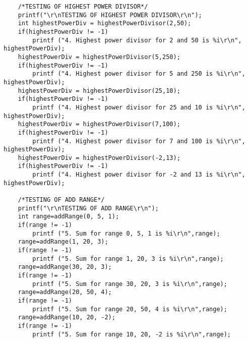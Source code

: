 \documentclass[4pt]{article}
\begin{document}
\begin{verbatim}
    /*TESTING OF HIGHEST POWER DIVISOR*/
    printf("\r\nTESTING OF HIGHEST POWER DIVISOR\r\n");
    int highestPowerDiv = highestPowerDivisor(2,50);
    if(highestPowerDiv != -1)
        printf ("4. Highest power divisor for 2 and 50 is %i\r\n", highestPowerDiv);
    highestPowerDiv = highestPowerDivisor(5,250);
    if(highestPowerDiv != -1)
        printf ("4. Highest power divisor for 5 and 250 is %i\r\n", highestPowerDiv);
    highestPowerDiv = highestPowerDivisor(25,10);
    if(highestPowerDiv != -1)
        printf ("4. Highest power divisor for 25 and 10 is %i\r\n", highestPowerDiv);
    highestPowerDiv = highestPowerDivisor(7,100);
    if(highestPowerDiv != -1)
        printf ("4. Highest power divisor for 7 and 100 is %i\r\n", highestPowerDiv);
    highestPowerDiv = highestPowerDivisor(-2,13);
    if(highestPowerDiv != -1)
        printf ("4. Highest power divisor for -2 and 13 is %i\r\n", highestPowerDiv);
    
    /*TESTING OF ADD RANGE*/
    printf("\r\nTESTING OF ADD RANGE\r\n");
    int range=addRange(0, 5, 1);
    if(range != -1)
        printf ("5. Sum for range 0, 5, 1 is %i\r\n",range);
    range=addRange(1, 20, 3);
    if(range != -1)
        printf ("5. Sum for range 1, 20, 3 is %i\r\n",range);
    range=addRange(30, 20, 3);
    if(range != -1)
        printf ("5. Sum for range 30, 20, 3 is %i\r\n",range);
    range=addRange(20, 50, 4);
    if(range != -1)
        printf ("5. Sum for range 20, 50, 4 is %i\r\n",range);
    range=addRange(10, 20, -2);
    if(range != -1)
        printf ("5. Sum for range 10, 20, -2 is %i\r\n",range);
    

\end{verbatim}
\end{document}
